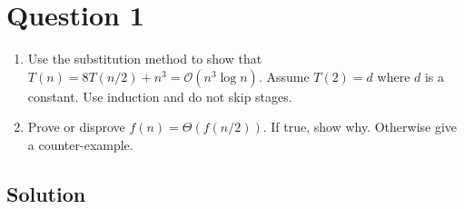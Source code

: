 
\section*{Question 1}

\begin{enumerate}[label=(\alph*)]
\item Use the substitution method to show that $T(n) = 8T(n/2) + n^3 = \mathcal{O}(n^3\log n)$.
Assume $T(2)=d$ where $d$ is a constant.
Use induction and do not skip stages.

\item Prove or disprove $f(n) = \Theta(f(n/2))$.
If true, show why.
Otherwise give a counter-example.
\end{enumerate}

\subsection*{Solution}

